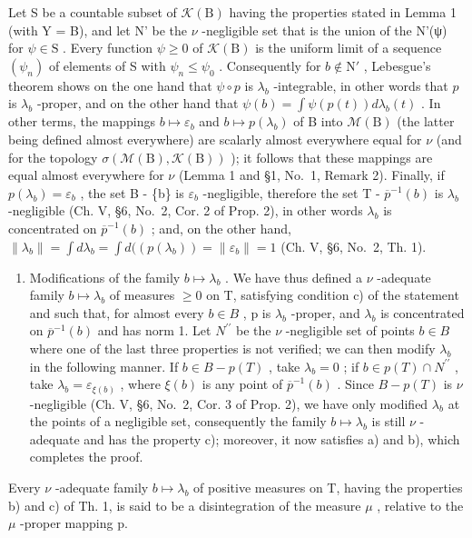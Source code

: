 Let S be a countable subset of \(\mathcal{K}(\mathrm{B})\) having the properties stated in Lemma 1 (with Y = B), and let N' be the \(\nu\) -negligible set that is the union of the N'(ψ) for \(\psi \in \mathrm{S}\) . Every function \(\psi \geqslant 0\) of \(\mathcal{K}(\mathrm{B})\) is the uniform limit of a sequence \((\psi_n)\) of elements of S with \(\psi_n \leqslant \psi_0\) . Consequently for \(b \notin \mathrm{N}'\) , Lebesgue's theorem shows on the one hand that \(\psi \circ p\) is \(\lambda_b\) -integrable, in other words that \(p\) is \(\lambda_b\) -proper, and on the other hand that \(\psi(b) = \int \psi(p(t)) d\lambda_b(t)\) . In other terms, the mappings \(b \mapsto \varepsilon_b\) and \(b \mapsto p(\lambda_b)\) of B into \(\mathcal{M}(\mathrm{B})\) (the latter being defined almost everywhere) are scalarly almost everywhere equal for \(\nu\) (and for the topology \(\sigma(\mathcal{M}(\mathrm{B}), \mathcal{K}(\mathrm{B}))\) ); it follows that these mappings are equal almost everywhere for \(\nu\) (Lemma 1 and §1, No.~1, Remark 2). Finally, if \(p(\lambda_b) = \varepsilon_b\) , the set B - \{b\} is \(\varepsilon_b\) -negligible, therefore the set T - \(\overline{p}^{-1}(b)\) is \(\lambda_b\) -negligible (Ch. V, §6, No.~2, Cor. 2 of Prop. 2), in other words \(\lambda_b\) is concentrated on \(\overline{p}^{-1} (b)\) ; and, on the other hand, \(\| \lambda_b\| = \int d\lambda_b = \int d((p(\lambda_b)) = \| \varepsilon_b\| = 1\) (Ch. V, §6, No.~2, Th. 1).

\begin{enumerate}
\def\labelenumi{\arabic{enumi})}
\setcounter{enumi}{4}
\tightlist
\item
  Modifications of the family \(b \mapsto \lambda_{b}\) . We have thus defined a \(\nu\) -adequate family \(b \mapsto \lambda_{b}\) of measures \(\geqslant 0\) on T, satisfying condition c) of the statement and such that, for almost every \(b \in B\) , p is \(\lambda_{b}\) -proper, and \(\lambda_{b}\) is concentrated on \(\overline{p}^{-1}(b)\) and has norm 1. Let \(N^{\prime\prime}\) be the \(\nu\) -negligible set of points \(b \in B\) where one of the last three properties is not verified; we can then modify \(\lambda_{b}\) in the following manner. If \(b \in B - p(T)\) , take \(\lambda_{b} = 0\) ; if \(b \in p(T) \cap N^{\prime\prime}\) , take \(\lambda_{b} = \varepsilon_{\xi(b)}\) , where \(\xi(b)\) is any point of \(\overline{p}^{-1}(b)\) . Since \(B - p(T)\) is \(\nu\) -negligible (Ch. V, §6, No.~2, Cor. 3 of Prop. 2), we have only modified \(\lambda_{b}\) at the points of a negligible set, consequently the family \(b \mapsto \lambda_{b}\) is still \(\nu\) -adequate and has the property c); moreover, it now satisfies a) and b), which completes the proof.
\end{enumerate}

Every \(\nu\) -adequate family \(b \mapsto \lambda_{b}\) of positive measures on T, having the properties b) and c) of Th. 1, is said to be a disintegration of the measure \(\mu\) , relative to the \(\mu\) -proper mapping p.

